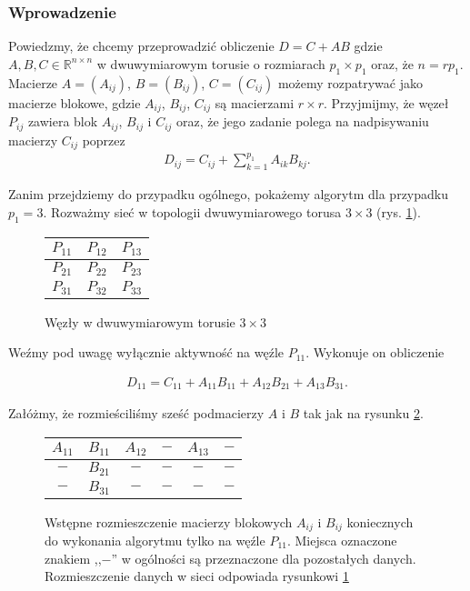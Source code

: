 \subsubsection{Wprowadzenie}
Powiedzmy, że chcemy przeprowadzić obliczenie \(D = C + AB\) gdzie \(A, B, C\in\mathbb{R}^{n\times n}\) w dwuwymiarowym torusie o rozmiarach \(p_1 \times p_1\) oraz, że \(n=rp_1\). Macierze \(A=(A_{ij})\), \(B=(B_{ij})\), \(C=(C_{ij})\) możemy rozpatrywać jako macierze blokowe, gdzie \(A_{ij}\), \(B_{ij}\), \(C_{ij}\) są macierzami \(r\times r\). Przyjmijmy, że węzeł \(P_{ij}\) zawiera blok \(A_{ij}\), \(B_{ij}\) i \(C_{ij}\) oraz, że jego zadanie polega na nadpisywaniu macierzy \(C_{ij}\) poprzez
\begin{align}\label{eq:cannon_per_node}
D_{ij}=C_{ij} + \sum_{k=1}^{p_1} A_{ik}B_{kj}.
\end{align}

Zanim przejdziemy do przypadku ogólnego, pokażemy algorytm dla przypadku \(p_1 = 3\). Rozważmy sieć w topologii dwuwymiarowego torusa \(3\times 3\) (rys. \ref{fig:cannon_torus1}).

\begin{figure}[h]
\centering
\begin{tabular}{|C{1.5cm}|C{1.5cm}|C{1.5cm}|}
\hline
\(P_{11}\) & \(P_{12}\) & \(P_{13}\) \\
\hline
\(P_{21}\) & \(P_{22}\) & \(P_{23}\) \\
\hline
\(P_{31}\) & \(P_{32}\) & \(P_{33}\) \\
\hline
\end{tabular}
\caption{Węzły w dwuwymiarowym torusie \(3\times 3\)}
\label{fig:cannon_torus1}
\end{figure}

\noindent Weźmy pod uwagę wyłącznie aktywność na węźle \(P_{11}\). Wykonuje on obliczenie

\begin{align}\label{eq:cannon_torus1}
D_{11}=C_{11}+A_{11}B_{11} + A_{12}B_{21} + A_{13}B_{31}.
\end{align}

\noindent Załóżmy, że rozmieściliśmy sześć podmacierzy \(A\) i \(B\) tak jak na rysunku \ref{fig:cannon_torus2}.

\begin{figure}[h]
\centering
\begin{tabular}{|cc|cc|cc|}
\hline
\(A_{11}\) & \(B_{11}\) & \(A_{12}\) & \(-\) & \(A_{13}\) & \(-\) \\
\hline
\(-\) & \(B_{21}\) & \(-\) & \(-\) & \(-\) & \(-\) \\
\hline
\(-\) & \(B_{31}\) & \(-\) & \(-\) & \(-\) & \(-\) \\
\hline
\end{tabular}
\caption{Wstępne rozmieszczenie macierzy blokowych \(A_{ij}\) i \(B_{ij}\) koniecznych do wykonania algorytmu tylko na węźle \(P_{11}\). Miejsca oznaczone znakiem ,,\(-\)'' w ogólności są przeznaczone dla pozostałych danych. Rozmieszczenie danych w sieci odpowiada rysunkowi 
\ref{fig:cannon_torus1}}
\label{fig:cannon_torus2}
\end{figure}

